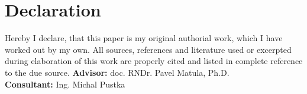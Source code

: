 \chapter*{Declaration}

\noindent
Hereby I declare, that this paper is my original authorial work, which I
have worked out by my own. All sources, references and literature used or
excerpted during elaboration of this work are properly cited and listed in
complete reference to the due source.
\vfill
\textbf{Advisor:} doc. RNDr. Pavel Matula, Ph.D. \\
\textbf{Consultant:} Ing. Michal Pustka